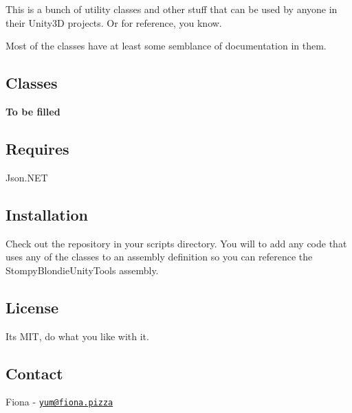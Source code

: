 This is a bunch of utility classes and other stuff that can be used by anyone in their Unity3D projects. Or for reference, you know.

Most of the classes have at least some semblance of documentation in them.

\subsection*{Classes }

{\bfseries To be filled}

\subsection*{Requires }


\begin{DoxyItemize}
\item Json.\+N\+ET
\end{DoxyItemize}

\subsection*{Installation }

Check out the repository in your scripts directory. You will to add any code that uses any of the classes to an assembly definition so you can reference the Stompy\+Blondie\+Unity\+Tools assembly.

\subsection*{License }

It\textquotesingle{}s M\+IT, do what you like with it.

\subsection*{Contact }

Fiona -\/ \href{mailto:yum@fiona.pizza}{\tt yum@fiona.\+pizza} 